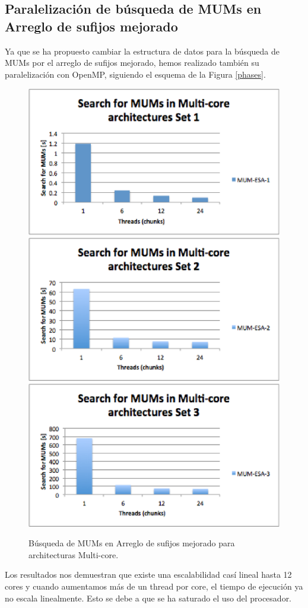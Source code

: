 \documentclass[12pt,a4paper]{article}
\begin{document}
\subsection{Paralelización de búsqueda de MUMs en Arreglo de sufijos mejorado}
Ya que se ha propuesto cambiar la estructura de datos para la búsqueda de MUMs por el arreglo de sufijos mejorado, hemos realizado también su paralelización con OpenMP, siguiendo el esquema de la Figura \ref{phases}.
 \begin{figure}[h] 
   \centering 
   \includegraphics[scale=0.5]{esa1.eps} 
   \includegraphics[scale=0.5]{esa2.eps} 
   \includegraphics[scale=0.5]{esa3.eps} 
  \caption{Búsqueda de MUMs en Arreglo de sufijos mejorado para architecturas Multi-core.} 
   \label{fig:stmc} 
 \end{figure}
Los resultados nos demuestran que existe una escalabilidad casí lineal hasta 12 cores y cuando aumentamos más de un thread por core, el tiempo de ejecución ya no escala linealmente. Esto se debe a que se ha saturado el uso del procesador.
\end{document}
